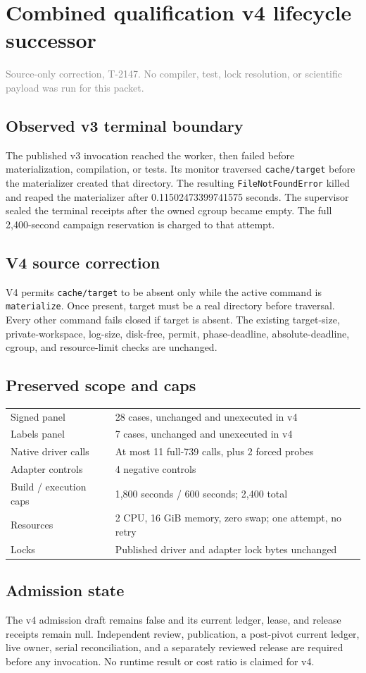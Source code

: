 \documentclass[10pt]{article}
\begin{document}
\section*{Combined qualification v4 lifecycle successor}
\textcolor{gray}{Source-only correction, T-2147. No compiler, test, lock
resolution, or scientific payload was run for this packet.}

\subsection*{Observed v3 terminal boundary}
The published v3 invocation reached the worker, then failed before
materialization, compilation, or tests. Its monitor traversed
\texttt{cache/target} before the materializer created that directory. The
resulting \texttt{FileNotFoundError} killed and reaped the materializer after
0.11502473399741575 seconds. The supervisor sealed the terminal receipts after
the owned cgroup became empty. The full 2,400-second campaign reservation is
charged to that attempt.

\subsection*{V4 source correction}
V4 permits \texttt{cache/target} to be absent only while the active command is
\texttt{materialize}. Once present, target must be a real directory before
traversal. Every other command fails closed if target is absent. The existing
target-size, private-workspace, log-size, disk-free, permit, phase-deadline,
absolute-deadline, cgroup, and resource-limit checks are unchanged.

\subsection*{Preserved scope and caps}
\begin{tabularx}{\textwidth}{@{}lX@{}}
Signed panel & 28 cases, unchanged and unexecuted in v4 \\
Labels panel & 7 cases, unchanged and unexecuted in v4 \\
Native driver calls & At most 11 full-739 calls, plus 2 forced probes \\
Adapter controls & 4 negative controls \\
Build / execution caps & 1,800 seconds / 600 seconds; 2,400 total \\
Resources & 2 CPU, 16 GiB memory, zero swap; one attempt, no retry \\
Locks & Published driver and adapter lock bytes unchanged \\
\end{tabularx}

\subsection*{Admission state}
The v4 admission draft remains false and its current ledger, lease, and release
receipts remain null. Independent review, publication, a post-pivot current
ledger, live owner, serial reconciliation, and a separately reviewed release
are required before any invocation. No runtime result or cost ratio is claimed
for v4.
\end{document}

